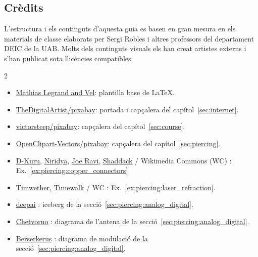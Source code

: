 \subsection*{Crèdits}

\noindent
L'estructura i els continguts d'aquesta guia es basen en gran mesura en els materials de classe elaborats per
Sergi Robles i altres professors del departament DEIC de la UAB.
Molts dels continguts visuals els han creat artistes externs i s'han publicat sota llicències compatibles:
\begin{multicols}{2}
\small
\begin{itemize}
\item \href{https://www.overleaf.com/latex/templates/the-legrand-orange-book-template-english/jtctyfmnpppc}{Mathias Legrand and Vel}: plantilla base de \LaTeX{}.
\item \href{https://pixabay.com/users/thedigitalartist-202249/}{TheDigitalArtist/pixabay}: portada i capçalera del capítol~\ref{sec:internet}.
\item \href{https://pixabay.com/users/victorsteep-9526460/}{victorsteep/pixabay}: capçalera del capítol~\ref{sec:course}.
\item \href{https://pixabay.com/users/openclipart-vectors-30363/}{OpenClipart-Vectors/pixabay}: capçalera del capítol~\ref{sec:piercing}.
\item 
\href{https://en.wikipedia.org/wiki/File:HDMI_connector-male_2_sharp_PNr\%C2\%B00059.jpg}{D-Kuru},
\href{https://commons.wikimedia.org/wiki/File:USB_Type-C_icon.svg}{Niridya},
\href{https://commons.wikimedia.org/wiki/File:N_Connector.jpg}{Joe Ravi},
\href{https://en.wikipedia.org/wiki/File:Photo-RJ11-MF.jpg}{Shaddack}
/ Wikimedia Commons (WC) : Ex.~\ref{ex:piercing:copper_connectors}
\item \href{https://en.wikipedia.org/wiki/File:Laser_in_fibre.jpg}{Timwether}, \href{https://commons.wikimedia.org/wiki/File:MMF_optical.jpg}{Timewalk} / WC : Ex.~\ref{ex:piercing:laser_refraction}.
\item \href{https://deepai.org/machine-learning-model/text2img}{deepai} : iceberg de la secció~\ref{sec:piercing:analog_digital}.
\item \href{https://commons.wikimedia.org/wiki/File:Dipole_receiving_antenna_animation_6_300ms.gif}{Chetvorno} : diagrama de l'antena de la secció~\ref{sec:piercing:analog_digital}.
\item \href{https://commons.wikimedia.org/wiki/File:Amfm3-en-de.gif}{Berserkerus} : diagrama de modulació de la secció~\ref{sec:piercing:analog_digital}.

\end{itemize}
\end{multicols}
